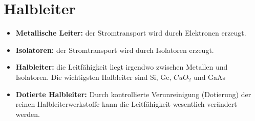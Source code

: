 \renewcommand{\arraystretch}{0.6}
\section{Halbleiter}
\begin{itemize}
    \item \textbf{Metallische Leiter:} der Stromtransport wird durch Elektronen erzeugt.
    \item \textbf{Isolatoren:} der Stromtransport wird durch Isolatoren erzeugt.
    \item \textbf{Halbleiter:} die Leitfähigkeit liegt irgendwo zwischen Metallen und Isolatoren.
    \subitem  Die wichtigsten Halbleiter sind  Si, Ge, $CuO_2$ und GaAs 
    \item \textbf{Dotierte Halbleiter:} Durch kontrollierte Verunreinigung (Dotierung) der reinen Halbleiterwerkstoffe kann die Leitfähigkeit wesentlich verändert werden.
\end{itemize}
